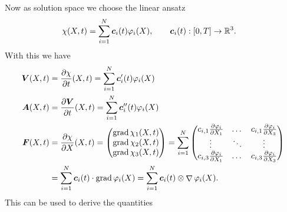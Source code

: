 \documentclass[a4paper,12pt]{article}
\DeclareMathOperator{\divergence}{\nabla}
\DeclareMathOperator{\grad}{grad}
\newcommand{\m}[1]{\ensuremath{\left(\begin{matrix}#1\end{matrix}\right)}}
\begin{document}
Now as solution space we choose the linear ansatz
\begin{align}
	\chi(X,t) &= \sum\limits_{i=1}^{N} \boldsymbol{c}_i(t)\varphi_i(X), \qquad \boldsymbol{c}_i(t):[0,T] \to\mathbb{R}^3.
\end{align}
With this we have
\begin{align}
	\vV(X,t) &= \d{\chi}{t}(X,t) = \sumi \vc_i'(t)\varphi_i(X)\\
	\vA(X,t) &= \d{\vV}{t}(X,t) = \sumi \vc_i''(t)\varphi_i(X)\\
	\vF(X,t) &= \d{\chi}{X}(X,t) = \m{\grad \chi_1(X,t)\\ \grad \chi_2(X,t)\\ \grad \chi_3(X,t)}
		   = \sumi\m{c_{i,1}\d{\varphi_i}{X_1} & \dots & c_{i,1}\d{\varphi_i}{X_3}\\
		   				\vdots & \ddots & \vdots\\
		   				c_{i,3}\d{\varphi_i}{X_1} & \dots & c_{i,3}\d{\varphi_i}{X_3}}\\
		   &=\sumi \vc_i(t)\cdot \grad\varphi_i(X) = \sumi \vc_i(t)\otimes \divergence\varphi_i(X).
\end{align}
This can be used to derive the quantities
\end{document}
